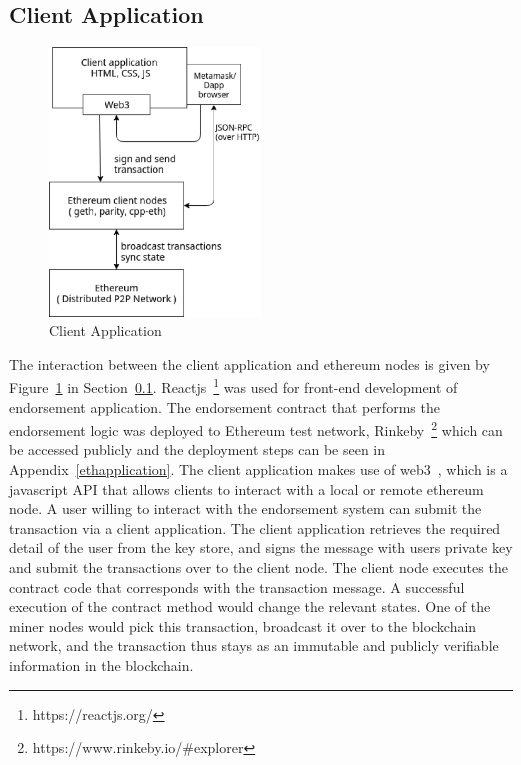 \subsection{Client Application} \label{clientapp}
\begin{figure}
	\centering
	\includegraphics[width=0.5\textwidth]{Images/ClientApplication.eps}
	\caption{Client Application}
	\label{fig:ClientApp}
\end{figure}
The interaction between the client application and ethereum nodes is given by
Figure~\ref{fig:ClientApp} in Section~\ref{clientapp}.
Reactjs~\footnote{https://reactjs.org/} was used for front-end development of
endorsement application. The endorsement contract that performs the endorsement
logic was deployed to Ethereum test network,
Rinkeby~\footnote{https://www.rinkeby.io/#explorer} which can be accessed
publicly and the deployment steps can be seen in Appendix~\ref{ethapplication}.
The client application makes use of web3~\cite{web3}, which is a javascript API
that allows clients to interact with a local or remote ethereum node. A user
willing to interact with the endorsement system can submit the transaction via
a client application. The client application retrieves the required detail of
the user from the key store, and signs the message with users private key and
submit the transactions over to the client node. The client node executes the
contract code that corresponds with the transaction message. A successful
execution of the contract method would change the relevant states. One of the
miner nodes would pick this transaction, broadcast it over to the blockchain
network, and the transaction thus stays as an immutable and publicly verifiable
information in the blockchain. 



